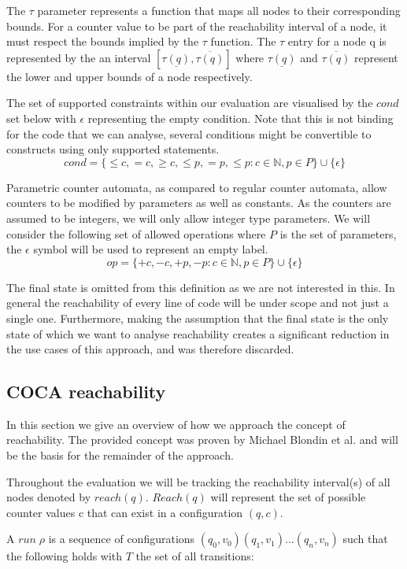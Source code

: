\documentclass[12pt]{article}
\begin{document}
The $\tau$ parameter represents a function that maps all nodes to their corresponding bounds. For a counter value to be part of the reachability interval of a node, it must respect the bounds implied by the $\tau$ function. The $\tau$ entry for a node q is represented by the an interval $[\underline{\tau(q)}, \overline{\tau(q)}]$ where $\underline{\tau(q)}$ and $\overline{\tau(q)}$ represent the lower and upper bounds of a node respectively.

The set of supported constraints within our evaluation are visualised by the $cond$ set below with $\epsilon$ representing the empty condition. Note that this is not binding for the code that we can analyse, several conditions might be convertible to constructs using only supported statements.
\[
cond = \{\leq c, =c, \geq c, \leq p, =p, \leq p: c \in \mathbb{N}, p \in P\} \cup \{\epsilon\}
\]

Parametric counter automata, as compared to regular counter automata, allow counters to be modified by parameters as well as constants. As the counters are assumed to be integers, we will only allow integer type parameters. We will consider the following set of allowed operations where $P$ is the set of parameters, the $\epsilon$ symbol will be used to represent an empty label.
\[
op = \{+c, -c, +p, -p: c \in \mathbb{N}, p \in P\} \cup \{\epsilon\}
\]

The final state is omitted from this definition as we are not interested in this. In general the reachability of every line of code will be under scope and not just a single one. Furthermore, making the assumption that the final state is the only state of which we want to analyse reachability creates a significant reduction in the use cases of this approach, and was therefore discarded.

\subsection{COCA reachability}
In this section we give an overview of how we approach the concept of reachability. The provided concept was proven by Michael Blondin et al. \cite{blondin2021continuous} and will be the basis for the remainder of the approach.

Throughout the evaluation we will be tracking the reachability interval(s) of all nodes denoted by $reach(q)$. $Reach(q)$ will represent the set of possible counter values c that can exist in a configuration $(q, c)$.

A $run\;\rho$ is a sequence of configurations $(q_0, v_0)(q_1, v_1)...(q_n, v_n)$ such that the following holds with $T$ the set of all transitions:
\end{document}
